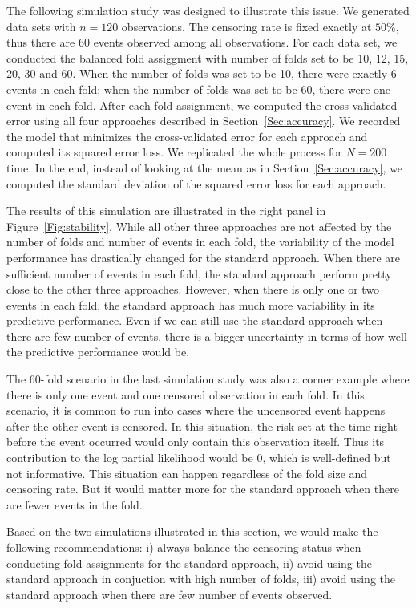 The following simulation study was designed to illustrate this issue. We generated data sets with $n = 120$ observations. The censoring rate is fixed exactly at $50\%$, thus there are 60 events observed among all observations. For each data set, we conducted the balanced fold assiggment with number of folds set to be 10, 12, 15, 20, 30 and 60. When the number of folds was set to be 10, there were exactly 6 events in each fold; when the number of folds was set to be 60, there were one event in each fold. After each fold assignment, we computed the cross-validated error using all four approaches described in Section~\ref{Sec:accuracy}. We recorded the model that minimizes the cross-validated error for each approach and computed its squared error loss. We replicated the whole process for $N = 200$ time. In the end, instead of looking at the mean as in Section~\ref{Sec:accuracy}, we computed the standard deviation of the squared error loss for each approach. 

The results of this simulation are illustrated in the right panel in Figure~\ref{Fig:stability}. While all other three approaches are not affected by the number of folds and number of events in each fold, the variability of the model performance has drastically changed for the standard approach. When there are sufficient number of events in each fold, the standard approach perform pretty close to the other three approaches. However, when there is only one or two events in each fold, the standard approach has much more variability in its predictive performance. Even if we can still use the standard approach when there are few number of events, there is a bigger uncertainty in terms of how well the predictive performance would be. 

The 60-fold scenario in the last simulation study was also a corner example where there is only one event and one censored observation in each fold. In this scenario, it is common to run into cases where the uncensored event happens after the other event is censored. In this situation, the risk set at the time right before the event occurred would only contain this observation itself. Thus its contribution to the log partial likelihood would be 0, which is well-defined but not informative. This situation can happen regardless of the fold size and censoring rate. But it would matter more for the standard approach when there are fewer events in the fold.

Based on the two simulations illustrated in this section, we would make the following recommendations: i) always balance the censoring status when conducting fold assignments for the standard approach, ii) avoid using the standard approach in conjuction with high number of folds, iii) avoid using the standard approach when there are few number of events observed.

